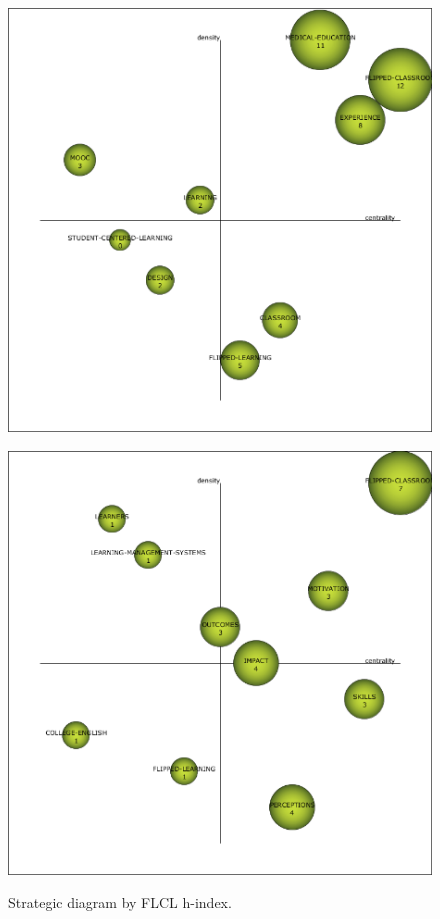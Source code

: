\documentclass{textolivre-html}
\begin{document}
\begin{figure}[htbp]
\begin{minipage}{.45\textwidth}
 \label{fig03d}
 \end{minipage}
 \par\vspace{2ex}
 \begin{minipage}{.45\textwidth}
 \includegraphics[width=\textwidth]{Fig03e.png}
 \label{fig03e}
 \end{minipage}
 \hfill
 \begin{minipage}{.45\textwidth}
 \includegraphics[width=\textwidth]{Fig03f.png}
 \label{fig03f}
 \end{minipage}
\caption{Strategic diagram by FLCL h-index.}
\label{fig03}
\end{figure}
 
\end{document}
